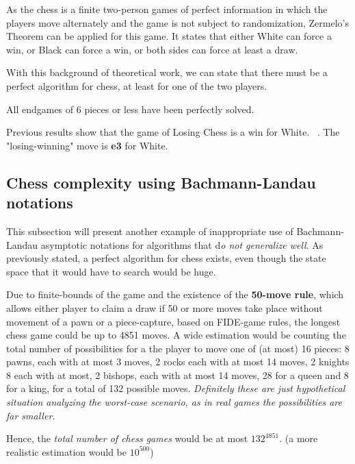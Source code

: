 \begin{remark}
As the chess is a finite two-person games of perfect information in which the players move alternately and the game is not subject to randomization, Zermelo's Theorem can be applied for this game. It states that either White can force a win, or Black can force a win, or both sides can force at least a draw.
\end{remark}

With this background of theoretical work, we can state that there must be a perfect algorithm for chess, at least for one of the two players.

\begin{remark}
All endgames of 6 pieces or less have been perfectly solved.
\end{remark}

\begin{remark}
Previous results show that the game of Losing Chess is a win for White. ~\cite{watkins2017losing}. The "losing-winning" move is \textbf{e3} for White.
\end{remark}


\subsection{Chess complexity using Bachmann-Landau notations}

This subsection will present another example of inappropriate use of Bachmann-Landau asymptotic notations for algorithms that d\textit{o not generalize well}. As previously stated, a perfect algorithm for chess exists, even though the state space that it would have to search would be huge. 

Due to finite-bounds of the game and the existence of the \textbf{50-move rule}, which allows either player to claim a draw if 50 or more moves take place without movement of a pawn or a piece-capture, based on FIDE-game rules, the longest chess game could be up to 4851 moves. A wide estimation would be counting the total number of possibilities for a the player to move one of (at most) 16 pieces: 8 pawns, each with at most 3 moves, 2 rocks each with at most 14 moves, 2 knights 8 each with at most, 2 bishops, each with at most 14 moves, 28 for a queen and 8 for a king, for a total of 132 possible moves. \textit{Definitely these are just hypothetical situation analyzing the worst-case scenario, as in real games the possibilities are far smaller.}

Hence, the \textit{total number of chess games} would be at most $132^{4851}$. (a more realistic estimation would be $10^{500}$)

